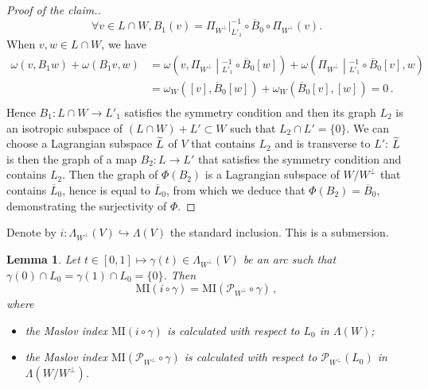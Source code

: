 \documentclass[10pt,a4paper]{amsart}
\numberwithin{equation}{section}
\renewcommand*\P{\mathcal{P}}
\newcommand{\MI}{\mathrm{MI}}
\let\oldtilde\tilde
\renewcommand*{\tilde}[1]{\mathchoice{\widetilde{#1}}{\widetilde{#1}}{\oldtilde{#1}}{\oldtilde{#1}}}
\let\oldforall\forall
\renewcommand*{\forall}{\mathrel{\oldforall}}
\newtheorem{lemm}[theo]{Lemma}
\theoremstyle{definition}
\theoremstyle{remark}
\begin{document}
\begin{proof}[Proof of the claim.]
\[
\forall v\in L\cap W, B_1(v)=\Pi_{W^\perp}|_{L'_1}^{-1}\circ \overline{B}_0\circ \Pi_{W^\perp}(v).
\]
When $v, w\in L\cap W$, we have
\begin{align*}
\omega(v, B_1w)+\omega(B_1v, w)&=
\omega\left(v,\Pi_{W^\perp}\middle|_{L'_1}^{-1}\circ \overline{B}_0[w]\right) +\omega\left(\Pi_{W^\perp}\middle|_{L'_1}^{-1}\circ \overline{B}_0[v],w\right)\\
&=\omega_W\left([v], \overline{B}_0[w]\right) +\omega_W\left(\overline{B}_0[v],[w]\right)=0\,.\\
\end{align*}
Hence $B_1:L\cap W\to L'_1$ satisfies the symmetry condition and then its graph $L_2$ is an isotropic subspace of $(L\cap W)+L'\subset W$ such that $L_2\cap L'=\{ 0\}$. We can choose a Lagrangian subspace $\tilde L$ of $V$ that contains $L_2$ and is transverse to $L'$: $\tilde L$ is then the graph of a map $B_2:L\to L'$ that satisfies the symmetry condition and contains $L_2$. Then the graph of $\Phi(B_2)$ is a Lagrangian subspace of $W/W^\bot$ that contains $\overline{L}_0$, hence is equal to $\overline{L}_0$, from which we deduce that $\Phi(B_2)=\overline{B}_0$, demonstrating the surjectivity of $\Phi$.
\end{proof}


Denote by $i:\Lambda_{W^\perp}(V)\hookrightarrow\Lambda(V)$ the standard inclusion. This is a submersion.

\begin{lemm}\label{sym red for vec space}
Let $t\in [0,1]\mapsto \gamma(t)\in\Lambda_{W^\perp}(V)$ be an arc such that $\gamma(0)\cap L_0=\gamma(1)\cap L_0=\{0\}$. Then
\[
\MI(i\circ\gamma)=\MI\left(\P_{W^\perp}\circ\gamma\right)\,,
\]
where
\begin{itemize}
\item the Maslov index $ \MI(i\circ\gamma)$ is calculated with respect to $L_0$ in $\Lambda(W)$;
\item the Maslov index $ \MI(\P_{W^\perp}\circ\gamma)$ is calculated with respect to $\P_{W^\perp}(L_0)$ in $\Lambda(W/W^\perp)$.
\end{itemize}
\end{lemm}
\end{document}

